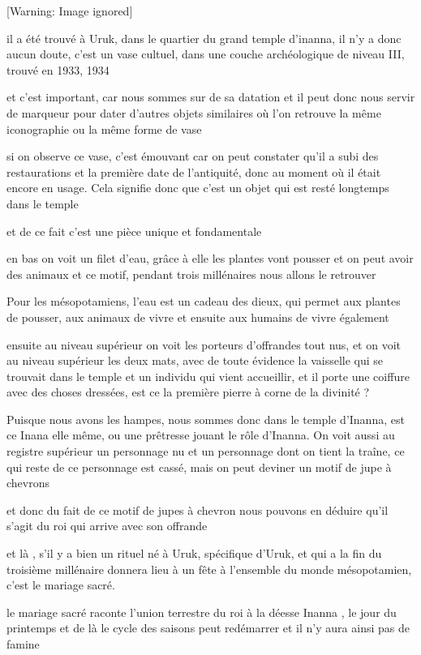 \documentclass[a4paper,10pt]{article}
\begin{document}
  [Warning: Image ignored] %
 

il a été trouvé à Uruk, dans le quartier du grand temple
d'inanna, il n'y a donc aucun doute,
c'est un vase cultuel, dans une couche archéologique
de niveau III, trouvé en 1933, 1934

et c'est important, car nous sommes sur de sa datation
et il peut donc nous servir de marqueur pour dater
d'autres objets similaires où l'on
retrouve la même iconographie ou la même forme de vase

si on observe ce vase, c'est émouvant car on peut
constater qu'il a subi des restaurations  et la
première date de l'antiquité, donc au moment où il
était encore en usage. Cela signifie donc que c'est un
objet qui est resté longtemps dans le temple

et de ce fait c'est une pièce unique et fondamentale

en bas on voit un filet d'eau, grâce à elle les 
plantes vont pousser  et on peut avoir des animaux et ce motif, pendant
trois millénaires nous allons le retrouver

Pour les mésopotamiens, l'eau est un cadeau des dieux,
qui permet aux plantes de pousser, aux animaux de vivre et ensuite aux
humains de vivre également

ensuite au niveau supérieur on voit les porteurs
d'offrandes tout nus, et on voit au niveau supérieur
les deux mats, avec de toute évidence la vaisselle qui se trouvait dans
le temple et un individu qui vient accueillir, et il porte une coiffure
avec des choses dressées, est  ce la première pierre à corne de la
divinité ?

Puisque nous avons les hampes, nous sommes donc dans le temple
d'Inanna, est ce Inana elle même, ou une prêtresse
jouant le rôle d'Inanna. On voit aussi au registre
supérieur un personnage nu et un personnage dont on tient la traîne, ce
qui reste de ce personnage est cassé, mais on peut deviner un motif de
jupe à chevrons

et donc du fait de ce motif de jupes à chevron nous pouvons en déduire
qu'il s'agit du roi qui arrive avec
son offrande

et là , s'il y a bien un rituel né à Uruk, spécifique
d'Uruk, et qui a la fin du troisième millénaire
donnera lieu à un fête à l'ensemble du monde
mésopotamien, c'est le mariage sacré.

le mariage sacré  raconte l'union terrestre du roi à la
déesse Inanna , le jour du printemps et de là le cycle des saisons peut
redémarrer et il n'y aura ainsi pas de famine
\end{document}
